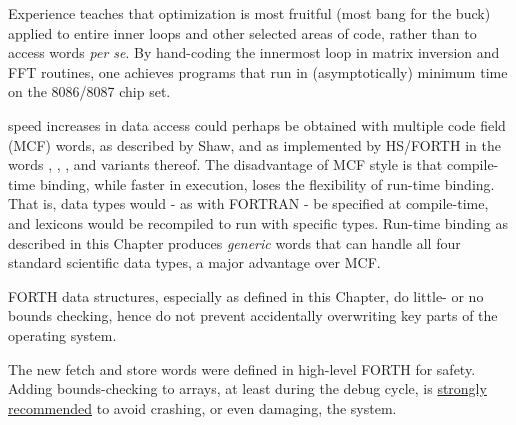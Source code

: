 Experience teaches that optimization is most fruitful (most bang for the buck) applied to entire inner loops and other selected areas of code, rather than to access words \textit{per se}. By hand-coding the innermost loop in matrix inversion and FFT routines, one achieves programs that run in (asymptotically) minimum time on the 8086/8087 chip set.

 speed increases in data access could perhaps be obtained with multiple code field (MCF) words, as described by Shaw, and as implemented by HS/FORTH in the words , , , and variants thereof. The disadvantage of MCF style is that compile-time binding, while faster in execution, loses the flexibility of run-time binding. That is, data types would - as with FORTRAN - be specified at compile-time, and lexicons would be recompiled to run with specific types. Run-time binding as described in this Chapter produces \textit{generic} words that can handle all four standard scientific data types, a major advantage over MCF.

\leftbar[1\linewidth]
FORTH data structures, especially as defined in this Chapter, do little- or no bounds checking, hence do not prevent accidentally overwriting key parts of the operating system.

The new fetch and store words were defined in high-level FORTH for safety. Adding bounds-checking to arrays, at least during the debug cycle, is \underline{strongly recommended} to avoid crashing, or even damaging, the system.
\endleftbar